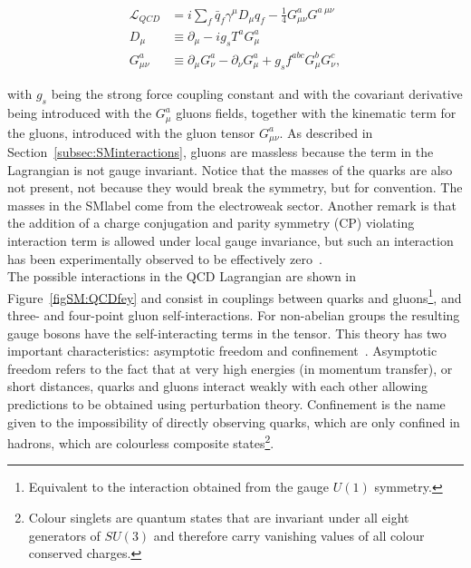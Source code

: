 \begin{equation}
\label{Theory_eq:diraceq30}
\begin{split}
    \mathcal{L}_{QCD} &= i\sum_f \bar{q}_f\gamma^\mu D_\mu q_f - \frac{1}{4}G_{\mu\nu}^aG^{a\ \mu\nu} \\
    D_{\mu \ } &\equiv \partial_\mu -ig_sT^aG^a_\mu \\
    G_{\mu\nu}^a &\equiv \partial_\mu G_\nu^a - \partial_\nu G_\mu^a + g_s f^{abc}G_\mu^b G_\nu^c,
\end{split}
\end{equation}

with $g_s$ being the strong force coupling constant and with the covariant derivative being introduced
with the $G_\mu^a$ gluons fields, together with the kinematic term for the gluons, introduced with the gluon tensor $G_{\mu\nu}^a$.
As described in Section~\ref{subsec:SMinteractions}, gluons are massless because the term in the Lagrangian is not gauge invariant.
Notice that the masses of the quarks are also not present, not because they would break the symmetry, but for convention.
The masses in the \acrshort{SMlabel} come from the electroweak sector.
Another remark is that the addition of a charge conjugation and parity symmetry (CP)
violating interaction term is allowed under local gauge invariance, but such an interaction has been experimentally observed
to be effectively zero~\cite{PhysRevLett.124.081803}.\\

The possible interactions in the QCD Lagrangian are shown in Figure~\ref{figSM:QCDfey} and consist in couplings between quarks and gluons\footnote{Equivalent to the interaction obtained from the gauge $U(1)$ symmetry.}, and three- and four-point gluon self-interactions. For non-abelian groups the resulting gauge bosons have the self-interacting terms in the tensor. This theory has two important characteristics: asymptotic freedom and confinement~\cite{PhysRevLett.30.1346,PhysRevLett.30.1343}. Asymptotic freedom refers to the fact that at very high energies (in momentum transfer), or short distances, quarks and gluons interact weakly with each other allowing predictions to be obtained using perturbation theory. Confinement is the name given to the impossibility of directly observing quarks, which are only confined in hadrons, which are colourless composite states\footnote{Colour singlets are quantum states that are invariant under all eight generators of $SU(3)$ and therefore carry vanishing values of all colour conserved charges.}.\\

